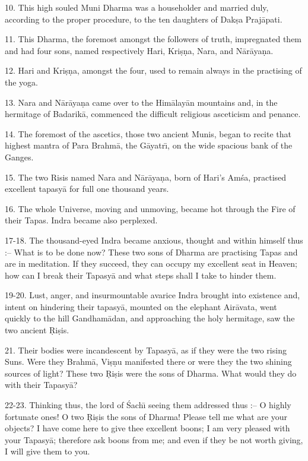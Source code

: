 10. This high souled Muni Dharma was a householder and married duly, according to the proper procedure, to the ten daughters of Dak\d{s}a Praj\=apati.

11. This Dharma, the foremost amongst the followers of truth, impregnated them and had four sons, named respectively Hari, Kri\d{s}\d{n}a, Nara, and N\=ar\=aya\d{n}a.

12. Hari and Kri\d{s}\d{n}a, amongst the four, used to remain always in the practising of the yoga.

13. Nara and N\=ar\=aya\d{n}a came over to the Him\=alay\=an mountains and, in the hermitage of Badarik\=a, commenced the difficult religious asceticism and penance.

14. The foremost of the ascetics, those two ancient Munis, began to recite that highest mantra of Para Brahm\=a, the G\=ayatr\={\i}, on the wide spacious bank of the Ganges.

15. The two Risis named Nara and N\=ar\=aya\d{n}a, born of Hari's Am\'sa, practised excellent tapasy\=a for full one thousand years.

16. The whole Universe, moving and unmoving, became hot through the Fire of their Tapas. Indra became also perplexed.

17-18. The thousand-eyed Indra became anxious, thought and within himself thus :-- What is to be done now? These two sons of Dharma are practising Tapas and are in meditation. If they succeed, they can occupy my excellent seat in Heaven; how can I break their Tapasy\=a and what steps shall I take to hinder them.

19-20. Lust, anger, and insurmountable avarice Indra brought into existence and, intent on hindering their tapasy\=a, mounted on the elephant Air\=avata, went quickly to the hill Gandham\=adan, and approaching the holy hermitage, saw the two ancient \d{R}i\d{s}is.

21. Their bodies were incandescent by Tapasy\=a, as if they were the two rising Suns. Were they Brahm\=a, Vi\d{s}\d{n}u manifested there or were they the two shining sources of light? These two \d{R}i\d{s}is were the sons of Dharma. What would they do with their Tapasy\=a?

22-23. Thinking thus, the lord of \'Sach\={\i} seeing them addressed thus :-- O highly fortunate ones! O two \d{R}i\d{s}is the sons of Dharma! Please tell me what are your objects? I have come here to give thee excellent boons; I am very pleased with your Tapasy\=a; therefore ask boons from me; and even if they be not worth giving, I will give them to you.

